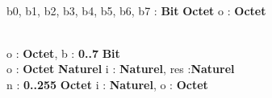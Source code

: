 \begin{algorithme}
    \\
    {b0, b1, b2, b3, b4, b5, b6, b7 : \textbf{Bit}}
    {\textbf{Octet}}
    {}
    {o : \textbf{Octet}}
    {  		
        
    }
    \\
    {o : \textbf{Octet}, b : \textbf{0..7}}
    {\textbf{Bit}}
    {}
    {}
    {
    }
 	\\
    {o : \textbf{Octet}}
    {\textbf{Naturel}}
    {}
    {i : \textbf{Naturel}, res :\textbf{Naturel} }
	{   
    {
    }
    }  
    \\
    {n : \textbf{0..255}}
    {\textbf{Octet}}
    {}{i : \textbf{Naturel}, o : \textbf{Octet}}
    { 
		{
      }
    }
\end{algorithme}

